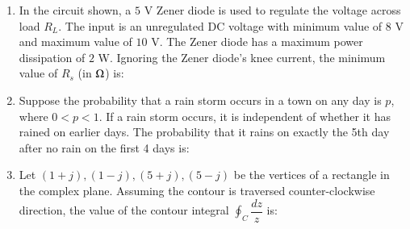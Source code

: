 \documentclass[journal,12pt,onecolumn]{IEEEtran}
\theoremstyle{remark}
\begin{document}
\begin{flushleft}
\begin{enumerate}
\begin{enumerate}
\end{enumerate}


\item In the circuit shown, a $5$ V Zener diode is used to regulate the voltage across load $R_L$.  
The input is an unregulated DC voltage with minimum value of $8$ V and maximum value of $10$ V.  
The Zener diode has a maximum power dissipation of $2$ W. Ignoring the Zener diode's knee current,  
the minimum value of $R_s$ (in $\ohm$) is:

\begin{enumerate}
\end{enumerate}


\item Suppose the probability that a rain storm occurs in a town on any day is $p$, where $0 < p < 1$.  
If a rain storm occurs, it is independent of whether it has rained on earlier days.  
The probability that it rains on exactly the 5th day after no rain on the first 4 days is:

\begin{enumerate}
\end{enumerate}


\item Let $(1+j), (1-j), (5+j), (5-j)$ be the vertices of a rectangle in the complex plane.  
Assuming the contour is traversed counter-clockwise direction,  
the value of the contour integral $\oint_C \dfrac{dz}{z}$ is:


\end{enumerate}
\end{flushleft}
\end{document}
